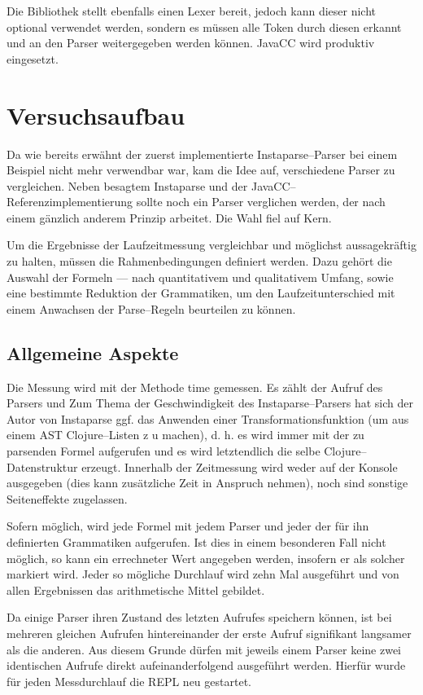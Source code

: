\documentclass[ngerman,a4paper,abstracton,open=right,twoside=false,toc=listofnumbered,bibtotocnumbered]{scrreprt}
\begin{document}
Die Bibliothek stellt ebenfalls einen Lexer bereit, jedoch kann dieser nicht optional verwendet werden, sondern es müssen alle Token durch diesen erkannt und an den Parser weitergegeben werden können. JavaCC wird produktiv eingesetzt.

\chapter{Versuchsaufbau}

Da wie bereits erwähnt der zuerst implementierte Instaparse--Parser bei einem Beispiel nicht mehr verwendbar war, kam die Idee auf, verschiedene Parser zu vergleichen. Neben besagtem Instaparse und der JavaCC--Referenzimplementierung sollte noch ein Parser verglichen werden, der nach einem gänzlich anderem Prinzip arbeitet. Die Wahl fiel auf Kern.

Um die Ergebnisse der Laufzeitmessung vergleichbar und möglichst aussagekräftig zu halten, müssen die Rahmenbedingungen definiert werden. Dazu gehört die Auswahl der Formeln --- nach quantitativem und qualitativem Umfang, sowie eine bestimmte Reduktion der Grammatiken, um den Laufzeitunterschied mit einem Anwachsen der Parse--Regeln beurteilen zu können.

\section{Allgemeine Aspekte}

Die Messung wird mit der Methode \glqq{}time\grqq{} gemessen. Es zählt der Aufruf des Parsers und Zum Thema der Geschwindigkeit des Instaparse--Parsers hat sich der Autor von Instaparse ggf. das Anwenden einer Transformationsfunktion (um aus einem AST Clojure--Listen z
u machen), d. h. es wird immer mit der zu parsenden Formel aufgerufen und es wird letztendlich die selbe Clojure--Datenstruktur erzeugt. Innerhalb der Zeitmessung wird weder auf der Konsole ausgegeben (dies kann zusätzliche Zeit in Anspruch nehmen), noch sind sonstige Seiteneffekte zugelassen.

Sofern möglich, wird jede Formel mit jedem Parser und jeder der für ihn definierten Grammatiken aufgerufen. Ist dies in einem besonderen Fall nicht möglich, so kann ein errechneter Wert angegeben werden, insofern er als solcher markiert wird. Jeder so mögliche Durchlauf wird zehn Mal ausgeführt und von allen Ergebnissen das arithmetische Mittel gebildet.

Da einige Parser ihren Zustand des letzten Aufrufes speichern können, ist bei mehreren gleichen Aufrufen hintereinander der erste Aufruf signifikant langsamer als die anderen. Aus diesem Grunde dürfen mit jeweils einem Parser keine zwei identischen Aufrufe direkt aufeinanderfolgend ausgeführt werden. Hierfür wurde für jeden Messdurchlauf die REPL neu gestartet.
\end{document}
